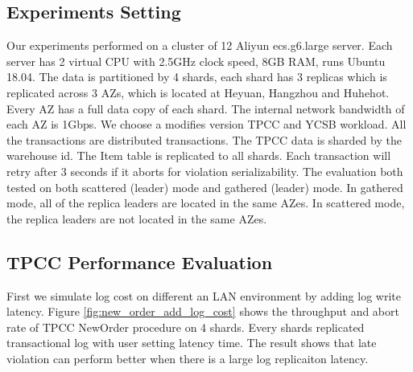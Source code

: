 \documentclass[conference]{IEEEtran}
\begin{document}
\subsection{Experiments Setting}
Our experiments performed on a cluster of 12 Aliyun ecs.g6.large server.
Each server has 2 virtual CPU with 2.5GHz clock speed, 8GB RAM, runs Ubuntu 18.04.
The data is partitioned by 4 shards, each shard has 3 replicas which is replicated across 3 AZs, which is located at Heyuan, Hangzhou and Huhehot.
Every AZ has a full data copy of each shard.
The internal network bandwidth of each AZ is 1Gbps.
We choose a modifies version TPCC and YCSB workload.
All the transactions are distributed transactions.
The TPCC data is sharded by the warehouse id.
The Item table is replicated to all shards.
Each transaction will retry after 3 seconds if it aborts for violation serializability.
The evaluation both tested on both scattered (leader) mode and gathered (leader) mode.
In gathered mode, all of the replica leaders are located in the same AZes.
In scattered mode, the replica leaders are not located in the same AZes.

\subsection{TPCC Performance Evaluation}

First we simulate log cost on different an LAN environment by adding log write latency.
Figure \ref{fig:new_order_add_log_cost} shows the throughput and abort rate of TPCC NewOrder procedure on 4 shards. 
Every shards replicated transactional log with user setting latency time.
The result shows that late violation can perform better when there is a large log replicaiton latency.
\end{document}
